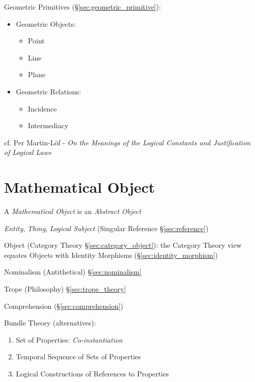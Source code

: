 Geometric Primitives (\S\ref{sec:geometric_primitive}):
\begin{itemize}
  \item Geometric Objects:
    \begin{itemize}
      \item Point
      \item Line
      \item Plane
    \end{itemize}
  \item Geometric Relations:
    \begin{itemize}
      \item Incidence
      \item Intermediacy
    \end{itemize}
\end{itemize}

cf. Per Martin-L\"of - \emph{On the Meanings of the Logical Constants and
  Justification of Logical Laws}



\section{Mathematical Object}\label{sec:mathematical_object}
\cite{laycock10}

A \emph{Mathematical Object} is an \emph{Abstract Object}

\emph{Entity}, \emph{Thing}, \emph{Logical Subject} (Singular
Reference \S\ref{sec:reference})

Object (Category Theory \S\ref{sec:category_object}): the Category
Theory view equates Objects with Identity Morphisms
(\S\ref{sec:identity_morphism})

Nominalism (Antithetical) \S\ref{sec:nominalism}

Trope (Philosophy) \S\ref{sec:trope_theory}

Comprehension (\S\ref{sec:comprehension})

Bundle Theory (alternatives):
\begin{enumerate}
  \item Set of Properties: \emph{Co-instantiation}
  \item Temporal Sequence of Sets of Properties
  \item Logical Constructions of References to Properties
\end{enumerate}

